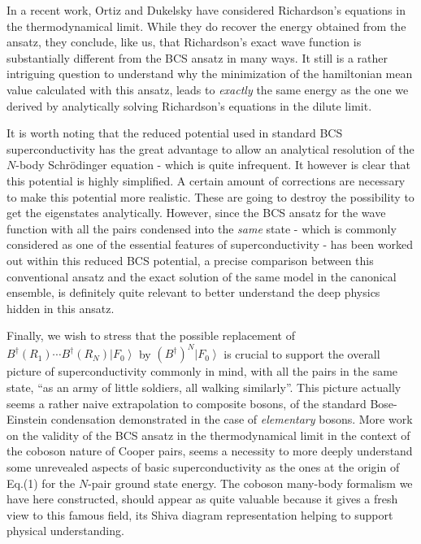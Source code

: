 \documentclass[epj]{svjour}
\begin{document}
In a recent work, Ortiz and Dukelsky\cite{crossoverRich} have  considered Richardson's equations in the thermodynamical limit. While they do recover the energy obtained from the ansatz, they conclude, like us, that Richardson's exact wave function is substantially different from the BCS ansatz in many ways.    It  still is a rather intriguing question to understand why the minimization of the hamiltonian mean value calculated with this ansatz, leads to \emph{exactly} the same energy as the one we derived by analytically solving Richardson's equations in the dilute limit.

It is worth noting that the reduced potential used in standard BCS superconductivity has the great advantage to allow an analytical resolution of the $N$-body Schr\"{o}dinger equation - which is quite infrequent. It however is clear that this potential is highly simplified. A certain amount of corrections are necessary to make this potential more realistic. These are going to destroy the possibility to get the eigenstates analytically. However, since the BCS ansatz for the wave function with all the pairs condensed into the \emph{same} state - which is commonly considered as one of the essential features of superconductivity - has been worked out within this reduced BCS potential, a precise comparison between this conventional ansatz and the exact solution of the same model in the canonical ensemble, is definitely quite relevant to better understand the deep physics hidden in this ansatz.

Finally, we wish to stress that the possible replacement of $B^{\dagger}(R_1)\cdots{}B^{\dagger}(R_N)%
\left|F_0\right>  $ by $\left(B^{\dagger}\right) ^N\left|F_0\right>  $ is
crucial to support the overall picture of
superconductivity commonly in mind, with all the pairs in the same state, ``as an army of
little soldiers, all walking similarly''.  This picture actually seems a rather naive extrapolation to composite bosons, of the standard Bose-Einstein condensation demonstrated in the case of  \emph{elementary} bosons. 
More work on the validity of the BCS 
ansatz in the thermodynamical limit in the context of the coboson nature of Cooper pairs, seems a necessity to more deeply understand some unrevealed aspects of basic superconductivity as the ones at the origin of Eq.(1) for the $N$-pair ground state energy. The coboson many-body formalism we have here constructed, should appear as quite valuable because it gives a fresh view to this famous field, its Shiva diagram representation helping to support physical understanding.
 
\end{document}
